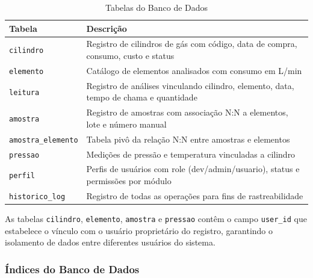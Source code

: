 \documentclass[12pt,a4paper]{article}
\begin{document}
\begin{table}[h!]
\centering
\caption{Tabelas do Banco de Dados}
\label{tab:bancos}
\begin{tabular}{@{}ll@{}}
\toprule
\textbf{Tabela} & \textbf{Descrição} \\
\midrule
\texttt{cilindro} & Registro de cilindros de gás com código, data de compra, consumo, custo e status \\
\texttt{elemento} & Catálogo de elementos analisados com consumo em L/min \\
\texttt{leitura} & Registro de análises vinculando cilindro, elemento, data, tempo de chama e quantidade \\
\texttt{amostra} & Registro de amostras com associação N:N a elementos, lote e número manual \\
\texttt{amostra\_elemento} & Tabela pivô da relação N:N entre amostras e elementos \\
\texttt{pressao} & Medições de pressão e temperatura vinculadas a cilindro \\
\texttt{perfil} & Perfis de usuários com role (dev/admin/usuario), status e permissões por módulo \\
\texttt{historico\_log} & Registro de todas as operações para fins de rastreabilidade \\
\bottomrule
\end{tabular}
\end{table}

As tabelas \texttt{cilindro}, \texttt{elemento}, \texttt{amostra} e \texttt{pressao} contêm o campo \texttt{user\_id} que estabelece o vínculo com o usuário proprietário do registro, garantindo o isolamento de dados entre diferentes usuários do sistema.

\subsubsection{Índices do Banco de Dados}
\end{document}
